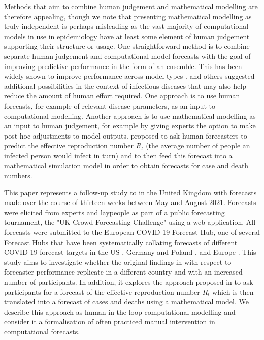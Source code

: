 \documentclass[10pt,a4paper,twocolumn]{article}
\begin{document}

Methods that aim to combine human judgement and mathematical modelling are therefore appealing, though we note that presenting mathematical modelling as truly independent is perhaps misleading as the vast majority of computational models in use in epidemiology have at least some element of human judgement supporting their structure or usage. One straightforward method is to combine separate human judgement and computational model forecasts with the goal of improving predictive performance in the form of an ensemble. This has been widely shown to improve performance across model types \citep{mcandrewChimericForecastingCombining2022}. \cite{farrowHumanJudgmentApproach2017, bosseComparingHumanModelbased2022} and others suggested additional possibilities in the context of infectious diseases that may also help reduce the amount of human effort required. One approach is to use human forecasts, for example of relevant disease parameters, as an input to computational modelling. Another approach is to use mathematical modelling as an input to human judgement, for example by giving experts the option to make post-hoc adjustments to model outputs. \citet{bosseComparingHumanModelbased2022} proposed to ask human forecasters to predict the effective reproduction number $R_t$ (the average number of people an infected person would infect in turn) and to then feed this forecast into a mathematical simulation model in order to obtain forecasts for case and death numbers. 

This paper represents a follow-up study to \citet{bosseComparingHumanModelbased2022} in the United Kingdom with forecasts made over the course of thirteen weeks between May and August 2021. Forecasts were elicited from experts and laypeople as part of a public forecasting tournament, the "UK Crowd Forecasting Challenge" using a web application. All forecasts were submitted to the European COVID-19 Forecast Hub, one of several Forecast Hubs that have been systematically collating forecasts of different COVID-19 forecast targets in the US \citep{cramerEvaluationIndividualEnsemble2021}, Germany and Poland \citep{bracherShorttermForecastingCOVID192021, bracherNationalSubnationalShortterm2021}, and Europe \citep{sherrattPredictivePerformanceMultimodel2022a}. This study aims to investigate whether the original findings in \citet{bosseComparingHumanModelbased2022} with respect to forecaster performance replicate in a different country and with an increased number of participants. In addition, it explores the approach proposed in \citet{bosseComparingHumanModelbased2022} to ask participants for a forecast of the effective reproduction number $R_t$ which is then translated into a forecast of cases and deaths using a mathematical model. We describe this approach as human in the loop computational modelling and consider it a formalisation of often practiced manual intervention in computational forecasts.
\end{document}

